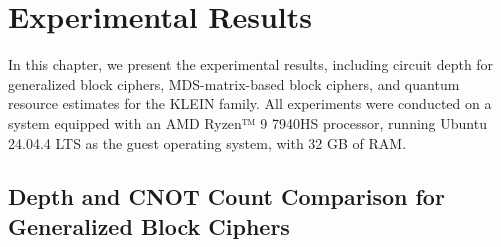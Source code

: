 \chapter{Experimental Results}
\label{ch:experimental-results}

In this chapter, we present the experimental results, including circuit depth for generalized block ciphers, MDS-matrix-based block ciphers, and quantum resource estimates for the KLEIN family. All experiments were conducted on a system equipped with an AMD Ryzen™ 9 7940HS processor, running Ubuntu 24.04.4 LTS as the guest operating system, with 32 GB of RAM.

\section{Depth and CNOT Count Comparison for Generalized Block Ciphers}

